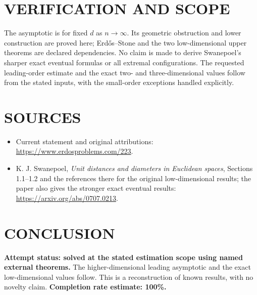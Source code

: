 \section{VERIFICATION AND SCOPE}
The asymptotic is for fixed $d$ as $n\to\infty$. Its geometric obstruction and lower construction are proved here; Erd\H{o}s--Stone and the two low-dimensional upper theorems are declared dependencies. No claim is made to derive Swanepoel's sharper exact eventual formulas or all extremal configurations. The requested leading-order estimate and the exact two- and three-dimensional values follow from the stated inputs, with the small-order exceptions handled explicitly.

\section{SOURCES}
\begin{itemize}
\item Current statement and original attributions: \url{https://www.erdosproblems.com/223}.
\item K. J. Swanepoel, \emph{Unit distances and diameters in Euclidean spaces}, Sections 1.1--1.2 and the references there for the original low-dimensional results; the paper also gives the stronger exact eventual results: \url{https://arxiv.org/abs/0707.0213}.
\end{itemize}
\section{CONCLUSION}
\textbf{Attempt status: solved at the stated estimation scope using named external theorems.} The higher-dimensional leading asymptotic and the exact low-dimensional values follow. This is a reconstruction of known results, with no novelty claim.
\textbf{Completion rate estimate: 100\%.}
